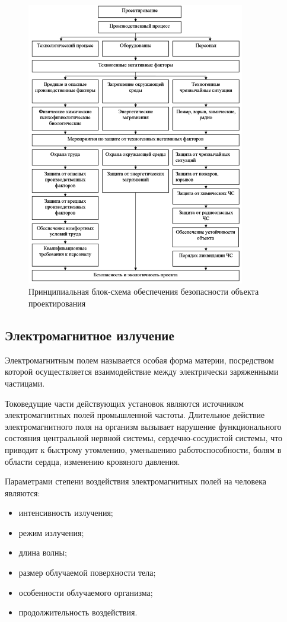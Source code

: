 \begin{figure}[H]
  \centering
  \includegraphics[width=0.85\textwidth]{diagrams/safety.png}
  \caption{Принципиальная блок-схема обеспечения безопасности объекта проектирования}
  \label{fig:safety}
\end{figure}

\subsection{Электромагнитное излучение}
Электромагнитным полем называется особая форма материи, посредством которой осуществляется взаимодействие между электрически заряженными частицами.

Токоведущие части действующих установок являются источником электромагнитных полей промышленной частоты.
Длительное действие электромагнитного поля на организм вызывает нарушение функционального состояния центральной нервной системы, сердечно-сосудистой системы, что приводит к быстрому утомлению, уменьшению работоспособности, болям в области сердца, изменению кровяного давления.

Параметрами степени воздействия электромагнитных полей на человека являются:
\begin{itemize}
  \item{интенсивность излучения;}
  \item{режим излучения;}
  \item{длина волны;}
  \item{размер облучаемой поверхности тела;}
  \item{особенности облучаемого организма;}
  \item{продолжительность воздействия.}
\end{itemize}

